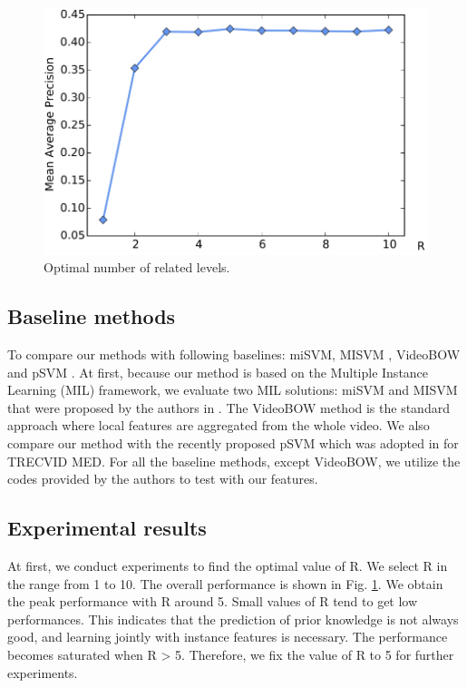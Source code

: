 \begin{figure}
	\centering
	\includegraphics[width=1\textwidth]{figure_3.pdf}
	\caption{Optimal number of related levels.}
	\label{figure_3}
\end{figure}


\subsection{Baseline methods} To compare our methods with following baselines: miSVM, MISVM \cite{andrews2002support}, VideoBOW and pSVM \cite{lai2014video}. At first, because our method is based on the Multiple Instance Learning (MIL) framework, we evaluate two MIL solutions: miSVM and MISVM that were proposed by the authors in \cite{andrews2002support}. The VideoBOW method is the standard approach where local features are aggregated from the whole video. We also compare our method with the recently proposed pSVM which was adopted in \cite{lai2014video} for TRECVID MED. For all the baseline methods, except VideoBOW, we utilize the codes provided by the authors to test with our features.


\subsection{Experimental results}
At first, we conduct experiments to find the optimal value of R. We select R in the range from 1 to 10. The overall performance is shown in Fig. \ref{figure_3}. We obtain the peak performance with R around 5. Small values of R tend to get low performances. This indicates that the prediction of prior knowledge is not always good, and learning jointly with instance features is necessary. The performance becomes saturated when R > 5. Therefore, we fix the value of R to 5 for further experiments.

